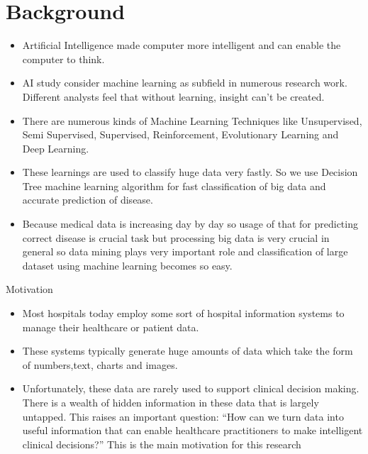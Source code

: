 \documentclass{SKP-beamer}
\begin{document}
\section{\textbf{Background}}

\begin{frame}
	\begin{itemize}
		\item Artificial Intelligence made computer more intelligent and can
		enable the computer to think. 
		\item AI study consider machine learning as subfield in numerous research work. Different
		analysts feel that without learning, insight can't be created.
		\item There are numerous kinds of Machine Learning Techniques
		like Unsupervised, Semi Supervised, Supervised, Reinforcement, Evolutionary Learning and Deep Learning.
		\item These learnings are used to classify huge data very fastly. So
		we use Decision Tree machine learning algorithm for fast
		classification of big data and accurate prediction of disease.
		\item Because medical data is increasing day by day so usage of that
		for predicting correct disease is crucial task but processing big
		data is very crucial in general so data mining plays very
		important role and classification of large dataset using
		machine learning becomes so easy.
	\end{itemize}
\end{frame}


\begin{frame}{Motivation}
	\begin{itemize}
		\item Most hospitals today employ some sort of hospital information systems to manage their healthcare or patient data. 
		\item These systems typically generate huge amounts of data which take the form of numbers,text, charts and images. 
		\item Unfortunately, these data are rarely used to support clinical decision making. There is a wealth of hidden information in these data that is largely untapped. This raises an important question:
	   “How can we turn data into useful information that can
	   enable healthcare practitioners to make intelligent
	   clinical decisions?” This is the main motivation for this
	research
\end{itemize}
\end{frame}
\end{document}
